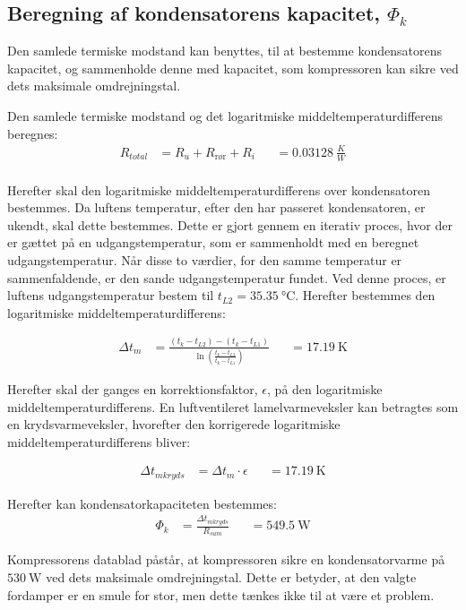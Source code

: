 \documentclass[../Hovedrapport.tex]{subfiles}
\begin{document}
\subsection{Beregning af kondensatorens kapacitet, $\Phi_k$}
Den samlede termiske modstand kan benyttes, til at bestemme kondensatorens kapacitet, og sammenholde denne med kapacitet, som kompressoren kan sikre ved dets maksimale omdrejningstal.

Den samlede termiske modstand og det logaritmiske middeltemperaturdifferens beregnes:
\begin{align*}
    R_{total}  &= R_{u}+R_\text{rør}+R_{i} &&= \SI{0,03128}{\frac{K}{W}} \\
\end{align*}

Herefter skal den logaritmiske middeltemperaturdifferens over kondensatoren bestemmes. Da luftens temperatur, efter den har passeret kondensatoren, er ukendt, skal dette bestemmes. Dette er gjort gennem en iterativ proces, hvor der er gættet på en udgangstemperatur, som er sammenholdt med en beregnet udgangstemperatur. Når disse to værdier, for den samme temperatur er sammenfaldende, er den sande udgangstemperatur fundet. Ved denne proces, er luftens udgangstemperatur bestem til $ t_{L2} = \SI{35,35}{\celsius} $. Herefter bestemmes den logaritmiske middeltemperaturdifferens:

\begin{align*}
    \Delta t_m &= \frac{\left(t_{k}-t_{L2}\right)-\left(t_{k}-t_{L1} \right)}{\ln{\left( \frac{t_{k}-t_{L2}}{t_{k}-t_{L1}} \right)}} &&= \SI{17,19}{\kelvin}
\end{align*}

Herefter skal der ganges en korrektionsfaktor, $ \epsilon $, på den logaritmiske middeltemperaturdifferens. En luftventileret lamelvarmeveksler kan betragtes som en krydsvarmeveksler, hvorefter den korrigerede logaritmiske middeltemperaturdifferens bliver:

\begin{align*}
    \Delta t_{mkryds} &= \Delta t_m \cdot \epsilon &&= \SI{17,19}{\kelvin}
\end{align*}

Herefter kan kondensatorkapaciteten bestemmes:
\begin{align*}
    \Phi_k &= \frac{\Delta t_{mkryds}}{R_{sum}} &&= \SI{549,5}{\watt}
\end{align*}

Kompressorens datablad påstår, at kompressoren sikre en kondensatorvarme på $\SI{530}{\watt}$ ved dets maksimale omdrejningstal. Dette er betyder, at den valgte fordamper er en smule for stor, men dette tænkes ikke til at være et problem.
\end{document}
